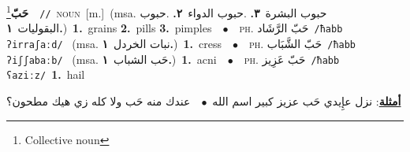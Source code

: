 \documentclass[10pt,a4paper,twoside]{article} %
\begin{document}
\begin{multicols}{2}
{\setlength\topsep{0pt}\textbf{\foreignlanguage{arabic}{حَبّ}}\footnote{Collective noun}\ \ {\color{gray}\texttt{//}\color{black}}\ \textsc{noun}\ [m.]\ \color{gray}(msa. \foreignlanguage{arabic}{حبوب البشرة}~\foreignlanguage{arabic}{\textbf{٣.}}  .\foreignlanguage{arabic}{حبوب الدواء}~\foreignlanguage{arabic}{\textbf{٢.}}  .\foreignlanguage{arabic}{حبوب البقوليات}~\foreignlanguage{arabic}{\textbf{١.}})\color{black}\ \textbf{1.}~grains  \textbf{2.}~pills  \textbf{3.}~pimples\ \ $\bullet$\ \ \textsc{ph.} \color{gray} \foreignlanguage{arabic}{حَبّ الرَّشَاد}\color{black}\ {\color{gray}\texttt{/{\sffamily ħabb ʔirraʃaːd}/}\color{black}}\ \color{gray} (msa. \foreignlanguage{arabic}{نبات الخردل}~\foreignlanguage{arabic}{\textbf{١.}})\color{black}\ \textbf{1.}~cress\ \ $\bullet$\ \ \textsc{ph.} \color{gray} \foreignlanguage{arabic}{حَبّ الشَّبَاب}\color{black}\ {\color{gray}\texttt{/{\sffamily ħabb ʔiʃʃabaːb}/}\color{black}}\ \color{gray} (msa. \foreignlanguage{arabic}{حَب الشباب}~\foreignlanguage{arabic}{\textbf{١.}})\color{black}\ \textbf{1.}~acni\ \ $\bullet$\ \ \textsc{ph.} \color{gray} \foreignlanguage{arabic}{حَبّ عَزِيز}\color{black}\ {\color{gray}\texttt{/{\sffamily ħabb ʕaziːz}/}\color{black}}\ \textbf{1.}~hail\  \begin{flushright}\color{gray}\foreignlanguage{arabic}{\textbf{\underline{\foreignlanguage{arabic}{أمثلة}}}: نزل عإِيدي حَب عزيز كبير اسم الله\ $\bullet$\ \  عندك منه حَب ولا كله زي هيك مطحون؟}\end{flushright}\color{black}} \vspace{2mm}


\end{multicols}
\end{document}
